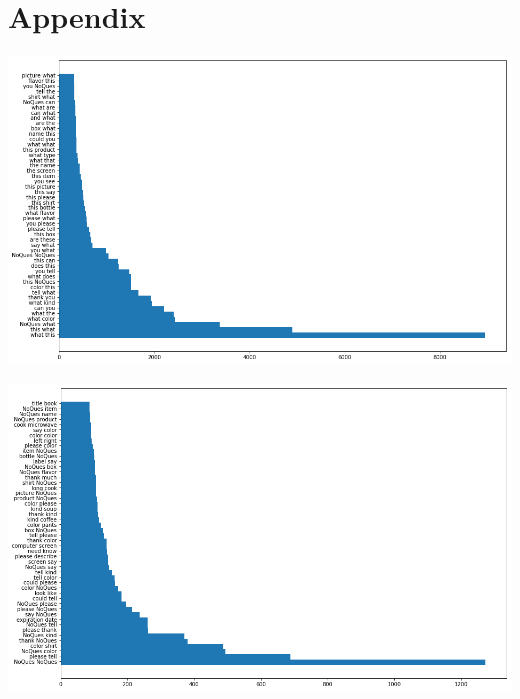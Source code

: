 \documentclass[sigconf]{acmart}
\begin{document}
\section{Appendix}
\noindent\begin{minipage}{\textwidth}
    \centering
    \includegraphics[scale=0.45]{images/bigram_all.png}
     \label{fig:bi_all}   
\end{minipage}
\noindent\begin{minipage}{\textwidth}
    \centering
    \includegraphics[scale=0.45]{images/bigram_interesting.png}
     \label{fig:bi_int}   
\end{minipage}
\end{document}

